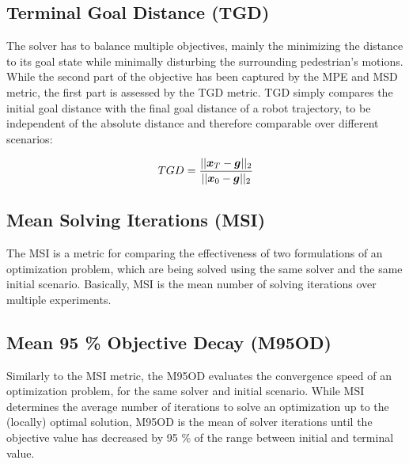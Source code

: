 \subsection{Terminal Goal Distance (TGD)}
The solver has to balance multiple objectives, mainly the minimizing the distance to its goal state while minimally disturbing the surrounding pedestrian's motions. While the second part of the objective has been captured by the MPE and MSD metric, the first part is assessed by the TGD metric. TGD simply compares the initial goal distance with the final goal distance of a robot trajectory, to be independent of the absolute distance and therefore comparable over different scenarios:

\begin{equation}
TGD = \frac{||\boldsymbol{x}_T - \boldsymbol{g}||_2}{||\boldsymbol{x}_0 - \boldsymbol{g}||_2}
\end{equation}

\subsection{Mean Solving Iterations (MSI)}
The MSI is a metric for comparing the effectiveness of two formulations of an optimization problem, which are being solved using the same solver and the same initial scenario. Basically, MSI is the mean number of solving iterations over multiple experiments.

\subsection{Mean 95 \% Objective Decay (M95OD)}
Similarly to the MSI metric, the M95OD evaluates the convergence speed of an optimization problem, for the same solver and initial scenario. While MSI determines the average number of iterations to solve an optimization up to the (locally) optimal solution, M95OD is the mean of solver iterations until the objective value has decreased by 95 \% of the range between initial and terminal value.
